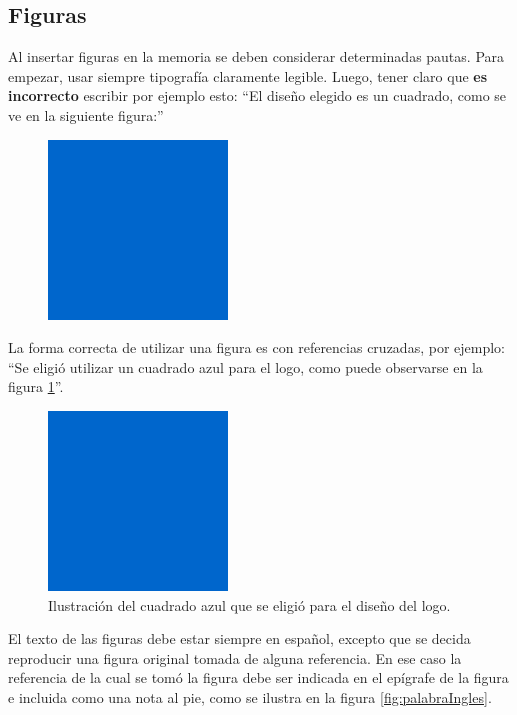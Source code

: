 \subsection{Figuras} 

Al insertar figuras en la memoria se deben considerar determinadas pautas. Para empezar, usar siempre tipografía claramente legible. Luego, tener claro que \textbf{es incorrecto} escribir por ejemplo esto: ``El diseño elegido es un cuadrado, como se ve en la siguiente figura:''

\begin{figure}[h]
\centering
\includegraphics[scale=.45]{./Figures/cuadradoAzul.png}
\end{figure}

La forma correcta de utilizar una figura es con referencias cruzadas, por ejemplo: ``Se eligió utilizar un cuadrado azul para el logo, como puede observarse en la figura \ref{fig:cuadradoAzul}''.

\begin{figure}[ht]
	\centering
	\includegraphics[scale=.45]{./Figures/cuadradoAzul.png}
	\caption{Ilustración del cuadrado azul que se eligió para el diseño del logo.}
	\label{fig:cuadradoAzul}
\end{figure}

El texto de las figuras debe estar siempre en español, excepto que se decida reproducir una figura original tomada de alguna referencia. En ese caso la referencia de la cual se tomó la figura debe ser indicada en el epígrafe de la figura e incluida como una nota al pie, como se ilustra en la figura \ref{fig:palabraIngles}.

